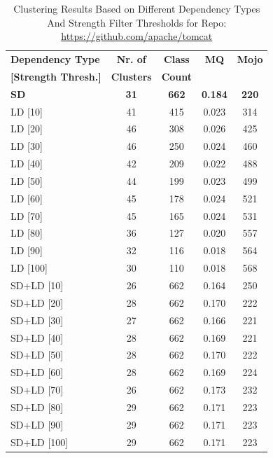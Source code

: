 \documentclass{ieeeaccess}
\begin{document}
\begin{table}[h]
\caption{Clustering Results Based on Different Dependency Types And Strength Filter Thresholds for Repo: \href{https://github.com/apache/tomcat}{https://github.com/apache/tomcat}}
\label{tab:clustering_results_tomcat}
\centering
\setlength{\tabcolsep}{10pt}
\begin{tabular}{|l|c|c|c|c|}
\hline
\textbf{Dependency Type} & \textbf{Nr. of} & \textbf{Class} & \textbf{MQ} & \textbf{Mojo} \\
\textbf{[Strength Thresh.]} & \textbf{Clusters} & \textbf{Count} &  &  \\
\hline
\textbf{SD} & \textbf{31} & \textbf{662} & \textbf{0.184} & \textbf{220} \\
LD [10] & 41 & 415 & 0.023 & 314 \\
LD [20] & 46 & 308 & 0.026 & 425 \\
LD [30] & 46 & 250 & 0.024 & 460 \\
LD [40] & 42 & 209 & 0.022 & 488 \\
LD [50] & 44 & 199 & 0.023 & 499 \\
LD [60] & 45 & 178 & 0.024 & 521 \\
LD [70] & 45 & 165 & 0.024 & 531 \\
LD [80] & 36 & 127 & 0.020 & 557 \\
LD [90] & 32 & 116 & 0.018 & 564 \\
LD [100] & 30 & 110 & 0.018 & 568 \\
\hline
SD+LD [10] & 26 & 662 & 0.164 & 250 \\
SD+LD [20] & 28 & 662 & 0.170 & 222 \\
SD+LD [30] & 27 & 662 & 0.166 & 221 \\
SD+LD [40] & 28 & 662 & 0.169 & 221 \\
SD+LD [50] & 28 & 662 & 0.170 & 222 \\
SD+LD [60] & 28 & 662 & 0.169 & 224 \\
SD+LD [70] & 26 & 662 & 0.173 & 232 \\
SD+LD [80] & 29 & 662 & 0.171 & 223 \\
SD+LD [90] & 29 & 662 & 0.171 & 223 \\
SD+LD [100] & 29 & 662 & 0.171 & 223 \\
\hline
\end{tabular}
\end{table}
\end{document}
